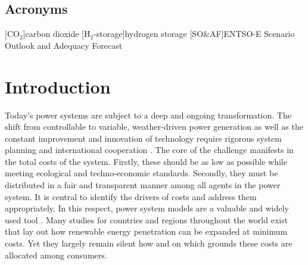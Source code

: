 \documentclass[11pt,twocolumn]{article}
\begin{document}
\subsection*{Acronyms}
\begin{acronym}[UMLX]
    [$\mathrm{CO_2}$]{carbon dioxide}
    [H$_2$-storage]{hydrogen storage}
    [SO\&AF]{\acs*{ENTSO-E} Scenario Outlook and Adequacy Forecast}
\end{acronym}


\section{Introduction}

Today's power systems are subject to a deep and ongoing transformation. The shift from controllable to variable, weather-driven power generation as well as the constant improvement and innovation of technology require rigorous system planning and international cooperation \cite{pfenninger_energy_2014,schlachtberger_benefits_2017}. The core of the challenge manifests in the total costs of the system. Firstly, these should be as low as possible while meeting ecological and techno-economic standards. Secondly, they must be distributed in a fair and transparent manner among all agents in the power system. It is central to identify the drivers of costs and address them appropriately.  
In this respect, power system models are a valuable and widely used tool \cite{pfenninger_energy_2014,bazmi_sustainable_2011,pereira_generation_2017,brown_sectoral_2019}. Many studies for countries and regions throughout the world exist that lay out how renewable energy penetration can be expanded at minimum costs. Yet they largely remain silent how and on which grounds these costs are allocated among consumers. 
\end{document}
